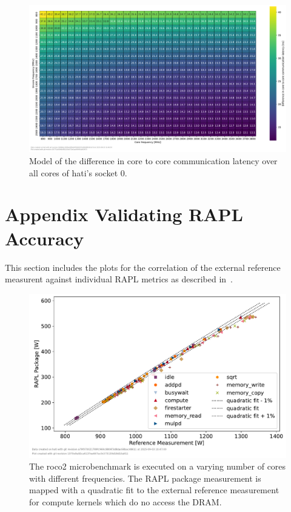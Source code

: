 \begin{figure}[]
    \centering
    \includegraphics[width=\columnwidth]{fig/core-to-core-latency/all-to-all-heatmap-model-diff.pdf}
    \caption{Model of the difference in core to core communication latency over all cores of hati's socket 0.}
\end{figure}


\chapter{Appendix Validating RAPL Accuracy}
\label{app:validating_rapl_accuracy}
This section includes the plots for the correlation of the external reference measurent against individual RAPL metrics as described in~.

\begin{figure}[]
    \centering
    \includegraphics[width=0.8\columnwidth]{fig/rapl-accuracy/rapl-accuracy-package.pdf}
    \caption{The roco2 microbenchmark is executed on a varying number of cores with different frequencies.
    The RAPL package measurement is mapped with a quadratic fit to the external reference measurement for compute kernels which do no access the DRAM.}
\end{figure}

